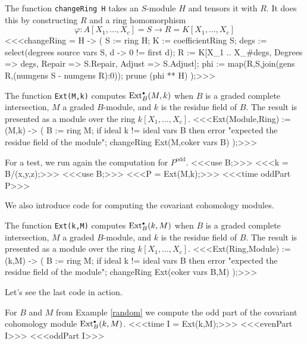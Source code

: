 \begin{sCode}
\label{change}
The function {\tt changeRing H} takes an $S$-module $H$ and tensors it
with $R$.  It does this by constructing $R$ and a ring homomorphism
\[
\varphi\colon A[X_1,\dots,X_c] = S \to R = K[X_1,\dots,X_c]
\]
<<<changeRing = H -> (
   S := ring H;
   K := coefficientRing S;
   degs := select(degrees source vars S,
        d -> 0 != first d);
   R := K[X_1 .. X_#degs, Degrees => degs,
        Repair => S.Repair, Adjust => S.Adjust];
   phi := map(R,S,join(gens R,(numgens S - numgens R):0));
   prune (phi ** H)
   );>>>
\end{sCode}

\begin{sCode}
\label{cohomology}
The function {\tt Ext(M,k)} computes $\operatorname{Ext}_B^{\scriptscriptstyle\bullet}(M,k)$ when $B$ is a
graded complete intersection, $M$ a graded $B$-module, and $k$ is the
residue field of $B$.  The result is presented as a module over the
ring $k[X_1,\dots,X_c]$.
<<<Ext(Module,Ring) := (M,k) -> (
   B := ring M;
   if ideal k != ideal vars B
   then error "expected the residue field of the module";
   changeRing Ext(M,coker vars B)
   );>>>
\end{sCode}

\begin{sExample}
For a test, we run again the computation for $P^{\text{odd}}$.
<<<use B;>>>
<<<k = B/(x,y,z);>>>
<<<use B;>>>
<<<P = Ext(M,k);>>>
<<<time oddPart P>>>
\end{sExample}

We also introduce code for computing the covariant cohomology modules.

\begin{sCode}
\label{covariant-cohomology}
The function {\tt Ext(k,M)} computes $\operatorname{Ext}_B^{\scriptscriptstyle\bullet}(k,M)$ when $B$ is a
graded complete intersection, $M$ a graded $B$-module, and $k$ is the
residue field of $B$.  The result is presented as a module over the
ring $k[X_1,\dots,X_c]$.
<<<Ext(Ring,Module) := (k,M) -> (
   B := ring M;
   if ideal k != ideal vars B
   then error "expected the residue field of the module";
   changeRing Ext(coker vars B,M)
   );>>>
\end{sCode}

Let's see the last code in action.

\begin{sExample}
For $B$ and $M$ from Example \ref{random} we compute the odd part of
the covariant cohomology module $\operatorname{Ext}^{\scriptscriptstyle\bullet}_B(k,M)$.
<<<time I = Ext(k,M);>>>
<<<evenPart I>>>
<<<oddPart I>>>
\end{sExample}

